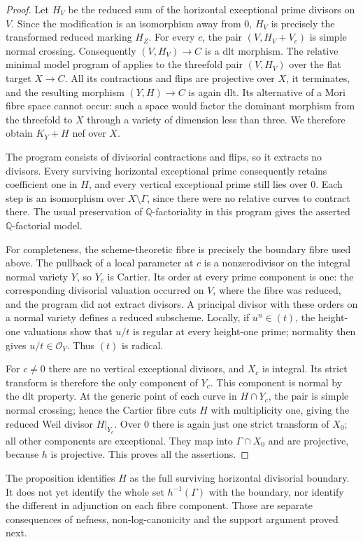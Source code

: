 \begin{proof}
Let $H_V$ be the reduced sum of the horizontal exceptional prime divisors on
$V$.  Since the modification is an isomorphism away from $0$, $H_V$ is
precisely the transformed reduced marking $H_Z$.  For every $c$, the pair
$(V,H_V+V_c)$ is simple normal crossing.
Consequently $(V,H_V)\to C$ is a dlt morphism.  The relative minimal model
program of \cite[Theorem~7.9]{KM1998} applies to the threefold pair $(V,H_V)$
over the flat target $X\to C$.  All its contractions and flips are projective
over $X$, it terminates, and the resulting morphism $(Y,H)\to C$ is again
dlt.  Its alternative of a Mori fibre space cannot occur: such a space would
factor the dominant morphism from the threefold to $X$ through a variety of
dimension less than three.  We therefore obtain $K_Y+H$ nef over $X$.

The program consists of divisorial contractions and flips, so it extracts
no divisors.  Every surviving horizontal exceptional prime consequently
retains coefficient one in $H$, and every vertical exceptional prime still
lies over $0$.  Each step is an isomorphism over $X\setminus\Gamma$, since
there were no relative curves to contract there.  The usual preservation of
$\mathbb Q$-factoriality in this program gives the asserted
$\mathbb Q$-factorial model.

For completeness, the scheme-theoretic fibre is precisely the boundary fibre
used above.  The pullback of a local parameter at $c$ is a nonzerodivisor on
the integral normal variety $Y$, so $Y_c$ is Cartier.  Its order at every prime
component is one: the corresponding divisorial valuation occurred on $V$,
where the fibre was reduced, and the program did not extract divisors.
A principal divisor with these orders on a normal variety defines a reduced
subscheme.  Locally, if $u^n\in(t)$, the height-one valuations show that
$u/t$ is regular at every height-one prime; normality then gives $u/t\in
\mathcal O_Y$.  Thus $(t)$ is radical.

For $c\ne0$ there are no vertical exceptional divisors, and $X_c$ is integral.
Its strict transform is therefore the only component of $Y_c$.  This component
is normal by the dlt property.  At the generic point of each curve in
$H\cap Y_c$, the pair is simple normal crossing; hence the Cartier fibre cuts
$H$ with multiplicity one, giving the reduced Weil divisor $H|_{Y_c}$.  Over $0$
there is again just one strict transform of $X_0$; all other components are
exceptional.  They map into $\Gamma\cap X_0$ and are projective, because $h$
is projective.  This proves all the assertions.
\end{proof}

The proposition identifies $H$ as the full surviving horizontal divisorial
boundary.  It does not yet identify the whole set $h^{-1}(\Gamma)$ with the
boundary, nor identify the different in adjunction on each fibre component.
Those are separate consequences of nefness, non-log-canonicity and the support
argument proved next.
